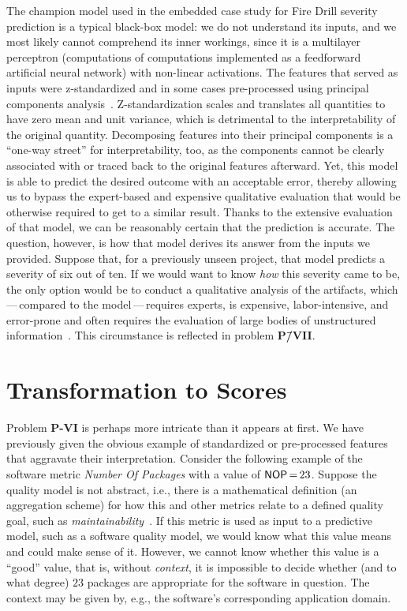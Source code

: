The champion model used in the embedded case study for Fire Drill severity prediction is a typical black-box model:
we do not understand its inputs, and we most likely cannot comprehend its inner workings, since it is a multilayer perceptron (computations of computations implemented as a feedforward artificial neural network) with non-linear activations.
The features that served as inputs were z-standardized and in some cases pre-processed using principal components analysis~\cite{pearson1901pca}.
Z-standardization scales and translates all quantities to have zero mean and unit variance, which is detrimental to the interpretability of the original quantity.
Decomposing features into their principal components is a ``one-way street'' for interpretability, too, as the components cannot be clearly associated with or traced back to the original features afterward.
Yet, this model is able to predict the desired outcome with an acceptable error, thereby allowing us to bypass the expert-based and expensive qualitative evaluation that would be otherwise required to get to a similar result.
Thanks to the extensive evaluation of that model, we can be reasonably certain that the prediction is accurate.
The question, however, is how that model derives its answer from the inputs we provided.
Suppose that, for a previously unseen project, that model predicts a severity of six out of ten.
If we would want to know \emph{how} this severity came to be, the only option would be to conduct a qualitative analysis of the artifacts, which\,---\,compared to the model\,---\,requires experts, is expensive, labor-intensive, and error-prone and often requires the evaluation of large bodies of unstructured information~\cite{Matsubara2021,muram2018,samalikova2014}.
This circumstance is reflected in problem \textbf{P\=/VII}.




\section{Transformation to Scores}\label{sec:transf-to-scores}
%
Problem \textbf{P-VI} is perhaps more intricate than it appears at first.
We have previously given the obvious example of standardized or pre-processed features that aggravate their interpretation.
Consider the following example of the software metric \emph{Number Of Packages} with a value of $\mathsf{NOP}\,{=}\,23$.
Suppose the quality model is not abstract, i.e., there is a mathematical definition (an aggregation scheme) for how this and other metrics relate to a defined quality goal, such as \emph{maintainability}~\cite{wagner2015quamoco,bouwers2013software}.
If this metric is used as input to a predictive model, such as a software quality model, we would know what this value means and could make sense of it.
However, we cannot know whether this value is a ``good'' value, that is, without \emph{context}, it is impossible to decide whether (and to what degree) $23$ packages are appropriate for the software in question.
The context may be given by, e.g., the software's corresponding application domain.



